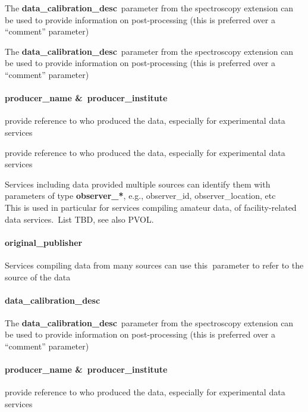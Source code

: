 \documentclass[11pt,a4paper]{ivoa}
\begin{document}
The\textbf{ \textbf{data\_calibration\_desc}} parameter from the spectroscopy extension can be used to provide information on post-processing (this is preferred over a ``comment'' parameter)

The\textbf{ \textbf{data\_calibration\_desc}} parameter from the spectroscopy extension can be used to provide information on post-processing (this is preferred over a ``comment'' parameter)

\paragraph{producer\_name \& producer\_institute\\}

provide reference to who produced the data, especially for experimental data services

provide reference to who produced the data, especially for experimental data services

Services\textbf{ }including data provided multiple sources can identify them with parameters of type \textbf{observer\_*}, e.g., observer\_id, observer\_location, etc\\This is used in particular for services compiling amateur data, of facility-related data services. List TBD, see also PVOL.

\paragraph{original\_publisher}

Services compiling data from many sources can use this\textbf{ }parameter to refer to the source of the data

\paragraph{data\_calibration\_desc}

The\textbf{ \textbf{data\_calibration\_desc}} parameter from the spectroscopy extension can be used to provide information on post-processing (this is preferred over a ``comment'' parameter)

\paragraph{producer\_name \& producer\_institute\\}

provide reference to who produced the data, especially for experimental data services
\end{document}
